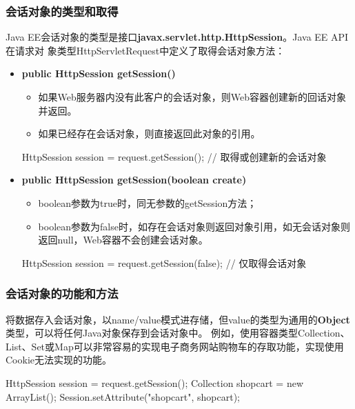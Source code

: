 \begin{frame}[fragile] %
\frametitle{会话对象的类型和取得} 

Java EE会话对象的类型是接口{\Blue\bf javax.servlet.http.HttpSession}。Java EE API在请求对
象类型HttpServletRequest中定义了取得会话对象方法：

\begin{itemize}
\item {\bf public HttpSession getSession()}\\
\begin{itemize}
\item 如果Web服务器内没有此客户的会话对象，则Web容器创建新的回话对象并返回。
\item 如果已经存在会话对象，则直接返回此对象的引用。
\end{itemize}
\begin{javaCode}
HttpSession session = request.getSession();  // 取得或创建新的会话对象
\end{javaCode}

\item {\bf public HttpSession getSession(boolean create)}\\
\begin{itemize}
\item boolean参数为true时，同无参数的getSession方法；
\item boolean参数为false时，如存在会话对象则返回对象引用，如无会话对象则返回null，Web容器不会创建会话对象。
\end{itemize}
\begin{javaCode}
HttpSession session = request.getSession(false);  // 仅取得会话对象
\end{javaCode}
\end{itemize}
\end{frame}

\begin{frame}[fragile] %
\frametitle{会话对象的功能和方法} 


将数据存入会话对象，以name/value模式进存储，但value的类型为通用的{\bf Object}类型，可以将任何Java对象保存到会话对象中。
{\kai 例如，使用容器类型Collection、List、Set或Map可以非常容易的实现电子商务网站购物车的存取功能，实现使用Cookie无法实现的功能。}

\begin{javaCode}
HttpSession session = request.getSession();
Collection shopcart = new ArrayList();
Session.setAttribute("shopcart", shopcart);
\end{javaCode}
\end{frame}

